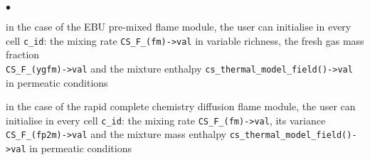 \begin{list}{$\bullet$}{}
       \item in the case of the EBU pre-mixed flame module, the user can
             initialise in every cell \texttt{c\_id}: the mixing rate
             \texttt{CS\_F\_(fm)->val} in variable richness, the
             fresh gas mass fraction \\
             \texttt{CS\_F\_(ygfm)->val}
             and the mixture enthalpy \texttt{cs\_thermal\_model\_field()->val} in
             permeatic conditions

        \item in the case of the rapid complete chemistry diffusion flame
             module, the user can initialise in every cell \texttt{c\_id}: the
             mixing rate \texttt{CS\_F\_(fm)->val}, its variance
             \texttt{CS\_F\_(fp2m)->val} and the mixture mass
             enthalpy \texttt{cs\_thermal\_model\_field()->val} in permeatic conditions


\end{list}
